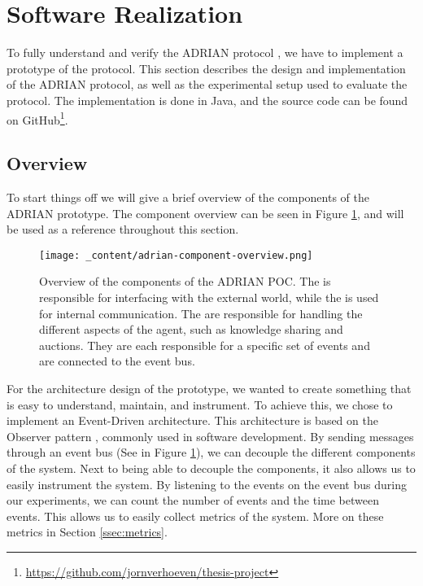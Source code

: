 \section{Software Realization}
\label{sec:software-realization}
To fully understand and verify the ADRIAN protocol \cite{mann2023ADRIAN}, we have to implement a prototype of the protocol. This section describes the design and implementation of the ADRIAN protocol, as well as the experimental setup used to evaluate the protocol. The implementation is done in Java, and the source code can be found on GitHub\footnote{\url{https://github.com/jornverhoeven/thesis-project}}. 


\subsection{Overview}
\label{ssec:overview}
To start things off we will give a brief overview of the components of the ADRIAN prototype. The component overview can be seen in Figure \ref{fig:adrian-component-overview}, and will be used as a reference throughout this section.

\begin{figure}[H]
    \centering
    \texttt{[image: \_content/adrian-component-overview.png]}
    \caption{Overview of the components of the ADRIAN POC. The  is responsible for interfacing with the external world, while the  is used for internal communication. The  are responsible for handling the different aspects of the agent, such as knowledge sharing and auctions. They are each responsible for a specific set of events and are connected to the event bus.}
    \label{fig:adrian-component-overview}
\end{figure}

For the architecture design of the prototype, we wanted to create something that is easy to understand, maintain, and instrument. To achieve this, we chose to implement an Event-Driven architecture. This architecture is based on the Observer pattern \cite{gamma1995design}, commonly used in software development. By sending messages through an event bus (See  in Figure \ref{fig:adrian-component-overview}), we can decouple the different components of the system. Next to being able to decouple the components, it also allows us to easily instrument the system. By listening to the events on the event bus during our experiments, we can count the number of events and the time between events. This allows us to easily collect metrics of the system. More on these metrics in Section \ref{ssec:metrics}.

